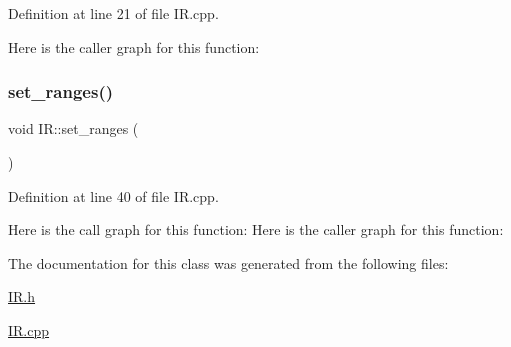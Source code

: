 Definition at line 21 of file I\+R.\+cpp.

Here is the caller graph for this function\+:
\mbox{\label{class_i_r_a8bcc5c0570384da5a39e395b91bc2d2b}} 
\subsubsection{\texorpdfstring{set\+\_\+ranges()}{set\_ranges()}}
{\footnotesize\ttfamily void I\+R\+::set\+\_\+ranges (\begin{DoxyParamCaption}{ }\end{DoxyParamCaption})}



Definition at line 40 of file I\+R.\+cpp.

Here is the call graph for this function\+:
Here is the caller graph for this function\+:


The documentation for this class was generated from the following files\+:\begin{DoxyCompactItemize}
\item 
\mbox{\hyperlink{_i_r_8h}{I\+R.\+h}}\item 
\mbox{\hyperlink{_i_r_8cpp}{I\+R.\+cpp}}\end{DoxyCompactItemize}
